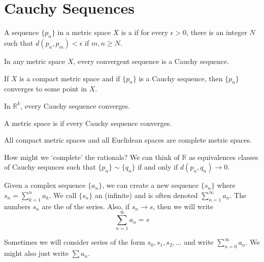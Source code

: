 \documentclass{jacky}
\newcommand{\rr}{\mathbb{R}}
\begin{document}
\section*{Cauchy Sequences}

\begin{bdefi}
  A sequence $\{p_n\}$ in a metric space $X$ is a  if
  for every $\epsilon>0$, there is an integer $N$ such that
  $d(p_n,p_m)<\epsilon$ if $m,n\ge N$.
\end{bdefi}

\begin{prop}
  In any metric space $X$, every convergent sequence is a Cauchy sequence.
\end{prop}

\begin{prop}
  If $X$ is a compact metric space and if $\{p_n\}$ is a Cauchy sequence, then
  $\{p_n\}$ converges to some point in $X$.
\end{prop}

\begin{prop}
  In $\rr^k$, every Cauchy sequence converges.
\end{prop}

\begin{defi}
  A metric space is  if every Cauchy sequence converges.
\end{defi}

\begin{prop}
  All compact metric spaces and all Euclidean spaces are complete metric spaces.
\end{prop}

\begin{note}
  How might we `complete' the rationals? We can think of $\rr$ as equivalences
  classes of Cauchy sequnces such that $\{p_n\}\sim\{q_n\}$ if and only if
  $d(p_n,q_n)\to0$.
\end{note}

\begin{bdefi}
  Given a complex sequence $\{a_n\}$, we can create a new sequence $\{s_n\}$
  where $s_n=\sum_{k=1}^na_k$. We call $\{s_n\}$ an (infinite) 
  and is often denoted $\sum_{n=1}^\infty a_n$. The numbers $s_n$ are the
   of the series. Also, if $s_n\to s$, then we will write
  $$\sum_{n=1}^\infty a_n=s$$
\end{bdefi}

\begin{note}
  Sometimes we will consider series of the form $s_0,s_1,s_2,\ldots$ and write
  $\sum_{n=0}^\infty a_n$. We might also just write $\sum a_n$.
\end{note}
\end{document}
